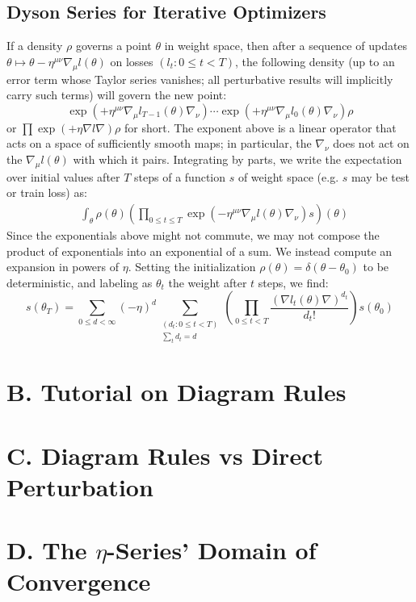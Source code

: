 \documentclass{article}
\begin{document}
\subsection*{Dyson Series for Iterative Optimizers}
    If a density $\rho$ governs a point $\theta$ in weight space, then after a
    sequence of updates $\theta \mapsto \theta - \eta^{\mu\nu} \nabla_\mu
    l(\theta)$ on losses $(l_t: 0\leq t < T)$, the following density (up to an
    error term whose Taylor series vanishes; all perturbative results will
    implicitly carry such terms) will govern the new point:
    \begin{equation}\label{eq:descexp}
        \exp\left(+\eta^{\mu\nu} \nabla_\mu l_{T-1}(\theta) \nabla_\nu\right) \cdots \exp\left(+\eta^{\mu\nu} \nabla_\mu l_0(\theta) \nabla_\nu\right) \rho
    \end{equation}
    or
    $
        \prod \exp\left(+\eta \nabla l \nabla\right) \rho
    $
    for short.
    The exponent above is a linear operator that acts on a space of
    sufficiently smooth maps; in particular, the $\nabla_\nu$ does not act on
    the $\nabla_\mu l(\theta)$ with which it pairs.  Integrating by parts, we
    write the expectation over initial values after $T$ steps of a function $s$
    of weight space (e.g. $s$ may be test or train loss) as:
    \begin{align}\label{eq:contraexp}
        &\int_\theta \rho(\theta) \left(\prod_{0 \leq t \leq T} \exp\left(-\eta^{\mu\nu} \nabla_\mu l(\theta) \nabla_\nu\right) s\right)(\theta)
    \end{align}
    Since the exponentials above might not commute, we may not compose
    the product of exponentials into an exponential of a sum.  We instead
    compute an expansion in powers of $\eta$.  Setting the initialization
    $\rho(\theta) = \delta(\theta-\theta_0)$ to be deterministic, and labeling
    as $\theta_t$ the weight after $t$ steps, we find:
    \begin{equation}\label{eq:dyson}
        s(\theta_T) =
        \sum_{0\leq d < \infty} (-\eta)^d \sum_{\substack{(d_t: 0\leq t<T) \\ \sum_t d_t = d}}
        \left(\prod_{0 \leq t < T} \frac{(\nabla l_t(\theta) \nabla)^{d_t}}{d_t!}\right) s (\theta_0)
    \end{equation}


\section*{B. Tutorial on Diagram Rules}

\section*{C. Diagram Rules vs Direct Perturbation}

\section*{D. The $\eta$-Series' Domain of Convergence}
\end{document}
